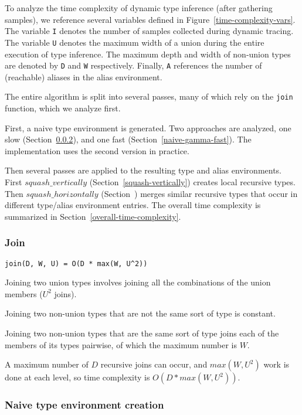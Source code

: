 To analyze the time complexity of dynamic type inference (after
gathering samples), we reference several variables 
defined in Figure~\ref{time-complexity-vars}.
The variable \texttt{I} denotes the number of samples
collected during dynamic tracing. The variable \texttt{U}
denotes the maximum width of a union during the entire execution
of type inference.
The maximum depth and width of non-union types are denoted by
\texttt{D} and \texttt{W} respectively.
Finally, \texttt{A} references the number of (reachable) aliases in the
alias environment.

The entire algorithm is split into several passes, many of which
rely on the \texttt{join} function, which we analyze first.

First, a naive type environment is generated. Two approaches
are analyzed, 
one slow (Section~\ref{naive-gamma-slow}),
and one fast (Section~\ref{naive-gamma-fast}).
The implementation uses the second version in practice.

Then several passes are applied to the resulting type and
alias environments. First $squash\_vertically$
(Section~\ref{squash-vertically}) creates local recursive
types.
Then $squash\_horizontally$ (Section~\label{squash-horizontally})
merges similar recursive types that occur in different type/alias
environment entries.
The overall time complexity is summarized in Section~\ref{overall-time-complexity}.

\subsubsection{Join}

\begin{verbatim}
join(D, W, U) = O(D * max(W, U^2))
\end{verbatim}

Joining two union types involves joining all the combinations of the union members ($U^2$ joins).

Joining two non-union types that are not the same sort of type is constant.

Joining two non-union types that are the same sort of type joins
each of the members of its types pairwise, of which the maximum number is $W$.

A maximum number of $D$ recursive joins can occur, and $max(W, U^2)$ work is done
at each level, so time complexity is $O(D * max(W, U^2))$.

\subsubsection{Naive type environment creation}
\label{naive-gamma-slow}

